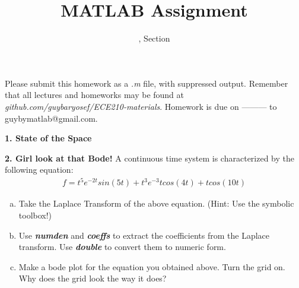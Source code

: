 \documentclass[11pt]{article}
\title{MATLAB Assignment \Homework}
\author{\Session, Section \Section}
\date{}
\makeatletter
\def\MyEmail{guybymatlab@gmail.com}
\def\DateOfSubmission{ --------- }
\makeatother
\begin{document}
\maketitle
Please submit this homework as a \textit{.m} file, 
with suppressed output.
Remember that all lectures and homeworks may be found at 
\textit{github.com/guybaryosef/ECE210-materials}.
Homework is due on \DateOfSubmission to \MyEmail.


\noindent
\newline
\textbf{1. State of the Space}


\noindent
\newline
\textbf{2. Girl look at that Bode!}
A continuous time system is characterized by the following equation:
\begin{align*}
    f=t^5e^{−2t}sin(5t) +t^3e^{−3}tcos(4t) +tcos(10t)
\end{align*}

\begin{enumerate}[a.]
    \item Take the Laplace Transform of the above equation. 
    (Hint:  Use the symbolic toolbox!)
    
    \item Use \textbf{\textit{numden}} and \textbf{\textit{coeffs}}
    to extract the coefficients from the Laplace transform. 
    Use \textbf{\textit{double}} to convert them to numeric form.
    
    \item Make a bode plot for the equation you obtained above. 
    Turn the grid on. Why does the grid look the way it does?
\end{enumerate}
\end{document}
